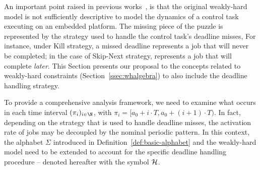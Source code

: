 An important point raised in previous works~\cite{Pazzaglia:2018, Pazzaglia:2019, Maggio:2020, Vreman:2021}, is that the original weakly-hard model is not sufficiently descriptive to model the dynamics of a control task executing on an embedded platform.
The missing piece of the puzzle is represented by the strategy used to handle the control task's deadline misses,  
For instance, under  Kill strategy, a missed deadline represents a job that will never be completed;
in the case of  Skip-Next strategy,  represents a job that will complete \emph{later}.
%
This Section presents our proposal to  the concepts related to weakly-hard constraints (Section~\ref{ssec:whalgebra}) to also include the deadline handling strategy. 

To provide a comprehensive analysis framework, we need to examine what occurs in each time interval $(\pi_i)_{i \in \N}$, with $\pi_i = [a_0 + i\cdot T, a_0 + (i+1)\cdot T)$. 
In fact, depending on the strategy that is used to handle deadline misses, the activation rate of jobs may be decoupled by the nominal periodic pattern.
In this context, the alphabet $\Sigma$ introduced in Definition~\ref{def:basic-alphabet} and the weakly-hard model need to be extended to account for the specific deadline handling procedure -- denoted hereafter with the symbol $\mathcal{H}$.
%

